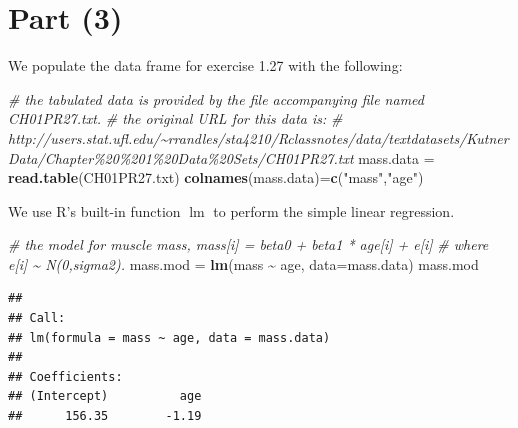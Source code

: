 \documentclass[
]{article}
\newenvironment{Shaded}{\begin{snugshade}}{\end{snugshade}}
\newcommand{\AttributeTok}[1]{\textcolor[rgb]{0.13,0.29,0.53}{#1}}
\newcommand{\CommentTok}[1]{\textcolor[rgb]{0.56,0.35,0.01}{\textit{#1}}}
\newcommand{\ConstantTok}[1]{\textcolor[rgb]{0.56,0.35,0.01}{#1}}
\newcommand{\DecValTok}[1]{\textcolor[rgb]{0.00,0.00,0.81}{#1}}
\newcommand{\FunctionTok}[1]{\textcolor[rgb]{0.13,0.29,0.53}{\textbf{#1}}}
\newcommand{\NormalTok}[1]{#1}
\newcommand{\OtherTok}[1]{\textcolor[rgb]{0.56,0.35,0.01}{#1}}
\newcommand{\SpecialCharTok}[1]{\textcolor[rgb]{0.81,0.36,0.00}{\textbf{#1}}}
\newcommand{\StringTok}[1]{\textcolor[rgb]{0.31,0.60,0.02}{#1}}
\begin{document}
\hypertarget{part-3}{%
\section{Part (3)}\label{part-3}}


We populate the data frame for exercise 1.27 with the following:

\begin{Shaded}
\begin{Highlighting}[]
\CommentTok{\# the tabulated data is provided by the file accompanying file named \textquotesingle{}CH01PR27.txt\textquotesingle{}.}
\CommentTok{\# the original URL for this data is:}
\CommentTok{\#     http://users.stat.ufl.edu/\textasciitilde{}rrandles/sta4210/Rclassnotes/data/textdatasets/KutnerData/Chapter\%20\%201\%20Data\%20Sets/CH01PR27.txt}
\NormalTok{mass.data }\OtherTok{=} \FunctionTok{read.table}\NormalTok{(}\StringTok{\textquotesingle{}CH01PR27.txt\textquotesingle{}}\NormalTok{)}
\FunctionTok{colnames}\NormalTok{(mass.data)}\OtherTok{=}\FunctionTok{c}\NormalTok{(}\StringTok{"mass"}\NormalTok{,}\StringTok{"age"}\NormalTok{)}
\end{Highlighting}
\end{Shaded}

We use R's built-in function \(\operatorname{lm}\) to perform the simple
linear regression.

\begin{Shaded}
\begin{Highlighting}[]
\CommentTok{\# the model for muscle mass, mass[i] = beta0 + beta1 * age[i] + e[i]}
\CommentTok{\# where e[i] \textasciitilde{} N(0,sigma2).}
\NormalTok{mass.mod }\OtherTok{=} \FunctionTok{lm}\NormalTok{(mass }\SpecialCharTok{\textasciitilde{}}\NormalTok{ age, }\AttributeTok{data=}\NormalTok{mass.data)}
\NormalTok{mass.mod}
\end{Highlighting}
\end{Shaded}

\begin{verbatim}
## 
## Call:
## lm(formula = mass ~ age, data = mass.data)
## 
## Coefficients:
## (Intercept)          age  
##      156.35        -1.19
\end{verbatim}

\begin{Shaded}
\end{Shaded}
\end{document}
